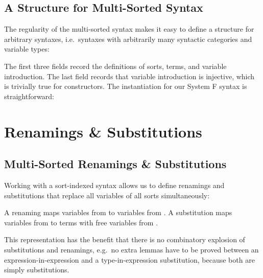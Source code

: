 \documentclass[a4paper, UKenglish, cleveref, autoref, thm-restate]{lipics-v2021}
\newenvironment{LibCode*}{%
  \begin{tcolorbox}[%
    colframe=white,%
    boxrule=0.0pt,%
    top=2.5pt,%
    left=2.5pt,%
    bottom=2.5pt,%
    right=2.5pt,%
    before skip=5pt,%
    after skip=5pt,%
    boxsep=0pt%
  ]
}{%
  \end{tcolorbox}%
}
\newenvironment{ExampleCode*}{%
  \begin{tcolorbox}[%
    colframe=white,%
    colback=yellow!5,%
    boxrule=0.0pt,%
    top=2.5pt,%
    left=2.5pt,%
    bottom=2.5pt,%
    right=2.5pt,%
    before skip=5pt,%
    after skip=5pt,%
    boxsep=0pt%
  ]\vspace{-0.2\baselineskip}%
}{%
  \vspace{-1\baselineskip}%
  \end{tcolorbox}%
}
\newcommand*\LibCode[1]{\begin{LibCode*}{#1}\end{LibCode*}}
\newcommand*\AppCode[1]{{#1}}
\newcommand*\ExampleCode[1]{\begin{ExampleCode*}{#1}\end{ExampleCode*}}
\newcommand*\ACode[1]{\AgdaFontStyle{\textcolor{mygray}{#1}}}
\newcommand*\AField[1]{\AgdaField{#1}}
\newcommand*\ACon[1]{\AgdaInductiveConstructor{#1}}
\newcommand*\ADef[1]{\AgdaFunction{#1}}
\begin{document}

  \subsection{A Structure for Multi-Sorted Syntax}
  \label{sec:syntax:structure}
  The regularity of the multi-sorted syntax makes it easy to define a
  structure for arbitrary syntaxes, i.e.\ syntaxes with arbitrarily
  many syntactic categories and variable types:
  \LibCode\KSyntax
  \noindent The first three fields record the definitions of sorts, terms, and variable introduction.
  The last field records that variable introduction
  \ACode{\AField{`\_}} is injective, which is trivially true for
  constructors. The instantiation for our System F syntax is
  straightforward:
  \AppCode\FSyntaxInst

  \section{Renamings \& Substitutions}
  \label{sec:maps}
  \subsection{Multi-Sorted Renamings \& Substitutions}
  \label{sec:maps:example}
  Working with a sort-indexed syntax allows us to define renamings and substitutions
  that replace all variables of all sorts simultaneously:

  \ExampleCode\FExampleSubRen

  \noindent A renaming \ACode{S₁ \ADef{→ᵣ} S₂} maps variables from \ACode{S₁} to
  variables from \ACode{S₂}.
  A substitution \ACode{S₁ \ADef{→ₛ} S₂} maps variables from \ACode{S₁} to
  terms with free variables from \ACode{S₂}.


  This representation has the benefit that there is no combinatory
  explosion of substitutions and renamings, e.g.\ no extra lemmas have to be
  proved between an expression-in-expression and a type-in-expression
  substitution, because both are simply substitutions.
\end{document}
